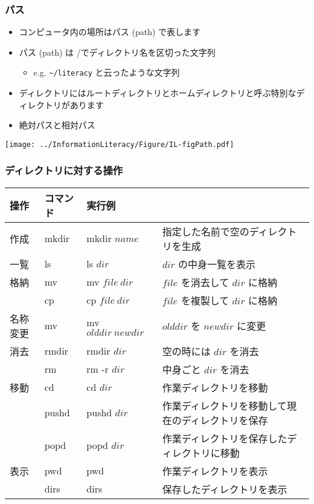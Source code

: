 \begin{frame}[containsverbatim]
\frametitle{パス}
  \begin{itemize}
\item コンピュータ内の場所はパス (path) で表します
\item パス (path) は \slash でディレクトリ名を区切った文字列
    \begin{itemize}
\item e.g. \verb|~/literacy| と云ったような文字列
    \end{itemize}
\item ディレクトリにはルートディレクトリとホームディレクトリと呼ぶ特別なディレクトリがあります
\item 絶対パスと相対パス
  \end{itemize}
  \begin{center}
\texttt{[image: ../InformationLiteracy/Figure/IL-figPath.pdf]}
  \end{center}
\end{frame}
\begin{frame}
\frametitle{ディレクトリに対する操作}
\scriptsize
  \begin{tabular}{l|l|lp{4cm}}
操作 & コマンド & 実行例 & \\\hline
作成 & mkdir & mkdir $name$ & 指定した名前で空のディレクトリを生成\\
一覧 & ls & ls $dir$ & $dir$ の中身一覧を表示\\
格納 & mv & mv $file\ dir$ & $file$ を消去して $dir$ に格納\\
     & cp & cp $file\ dir$ & $file$ を複製して $dir$ に格納\\
名称変更 & mv & mv $olddir\ newdir$ & $olddir$ を $newdir$ に変更\\
消去 & rmdir & rmdir $dir$ & 空の時には $dir$ を消去\\
     & rm    & rm -r $dir$ & 中身ごと $dir$ を消去\\
移動 & cd & cd $dir$ & 作業ディレクトリを移動\\
     & pushd & pushd $dir$ & 作業ディレクトリを移動して現在のディレクトリを保存\\
     & popd & popd $dir$ & 作業ディレクトリを保存したディレクトリに移動\\
表示 & pwd & pwd & 作業ディレクトリを表示\\
     & dirs & dirs & 保存したディレクトリを表示\\
  \end{tabular}
\end{frame}
